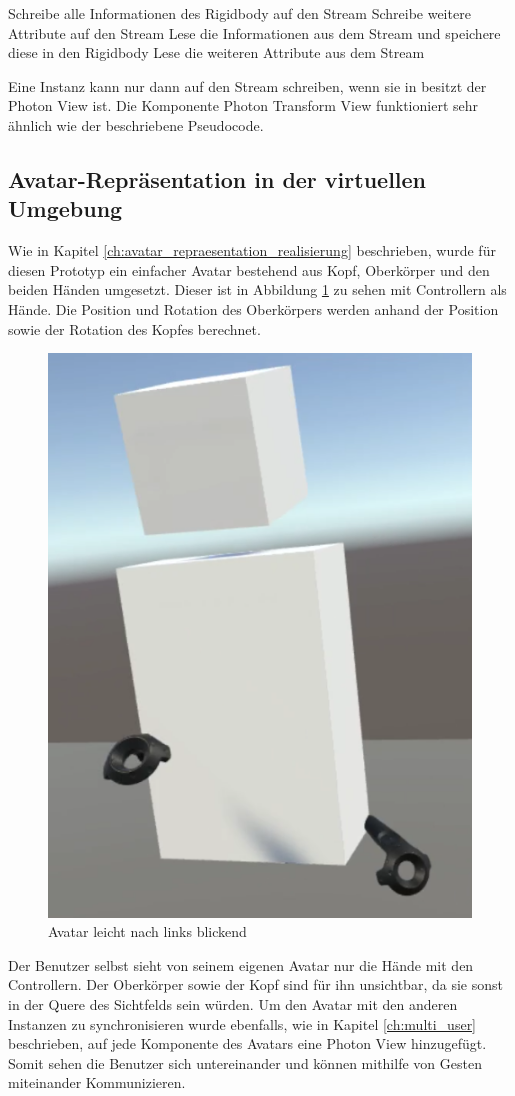 \begin{algorithm}
	 {
		Schreibe alle Informationen des Rigidbody auf den Stream\;
		Schreibe weitere Attribute auf den Stream\;
	}{
		Lese die Informationen aus dem Stream und speichere diese in den Rigidbody\;
		Lese die weiteren Attribute aus dem Stream\;	
	}
\end{algorithm}

Eine Instanz kann nur dann auf den Stream schreiben, wenn sie in besitzt der Photon View ist. Die Komponente Photon Transform View funktioniert sehr ähnlich wie der beschriebene Pseudocode.

\subsection{Avatar-Repräsentation in der virtuellen Umgebung}

Wie in Kapitel \ref{ch:avatar_repraesentation_realisierung} beschrieben, wurde für diesen Prototyp ein einfacher Avatar bestehend aus Kopf, Oberkörper und den beiden Händen umgesetzt. Dieser ist in Abbildung \ref{fig:avatar} zu sehen mit Controllern als Hände. Die Position und Rotation des Oberkörpers werden anhand der Position sowie der Rotation des Kopfes berechnet.

\begin{figure}[h!]
	\centering
	\includegraphics[keepaspectratio,width=0.4\linewidth]{img/Avatar.PNG}
	\caption{Avatar leicht nach links blickend}
	\label{fig:avatar}
\end{figure} 

Der Benutzer selbst sieht von seinem eigenen Avatar nur die Hände mit den Controllern. Der Oberkörper sowie der Kopf sind für ihn unsichtbar, da sie sonst in der Quere des Sichtfelds sein würden. Um den Avatar mit den anderen Instanzen zu synchronisieren wurde ebenfalls, wie in Kapitel \ref{ch:multi_user} beschrieben, auf jede Komponente des Avatars eine Photon View hinzugefügt. Somit sehen die Benutzer sich untereinander und können mithilfe von Gesten miteinander Kommunizieren.

